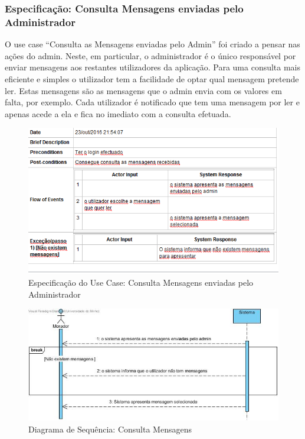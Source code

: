 \newpage

\subsubsection{Especificação: Consulta Mensagens enviadas pelo Administrador }

O use case “Consulta as Mensagens enviadas pelo Admin” foi criado a pensar nas ações do admin. Neste, em particular, o administrador é o único responsável por enviar mensagens aos restantes utilizadores da aplicação. Para uma consulta mais eficiente e simples o utilizador tem a facilidade de optar qual mensagem pretende ler. Estas mensagens são as mensagens que o admin envia com os valores em falta, por exemplo. Cada utilizador é notificado que tem uma mensagem por ler e apenas acede a ela e fica no imediato com a consulta efetuada.

\begin{figure}[htb!]
	\centering
	\includegraphics[scale=0.6]{imagens/Especificacoes/consultasmsadmin}  
	\caption{Especificação do Use Case: Consulta Mensagens enviadas pelo Administrador}  
\end{figure}

\begin{figure}[htb!]
	\centering
	\includegraphics[scale=0.5]{imagens/diagramaSeq/ConsultarMensagensdoAdmin}  
	\caption{Diagrama de Sequência: Consulta Mensagens}  
\end{figure}


